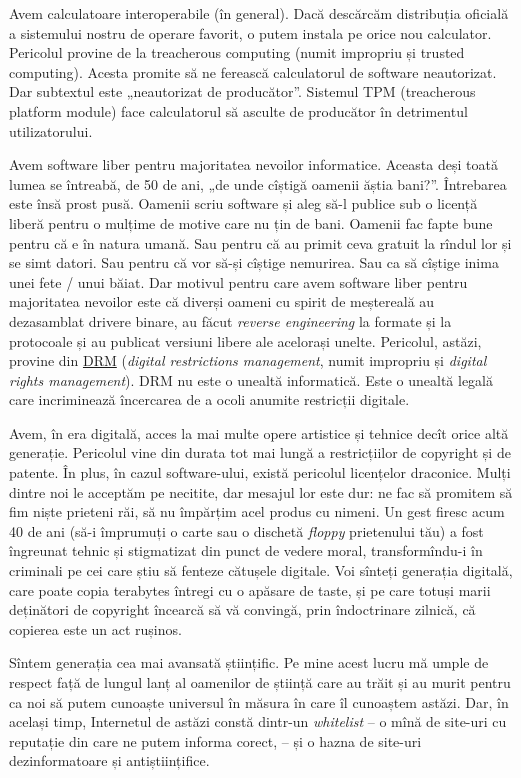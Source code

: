 Avem calculatoare interoperabile (în general). Dacă descărcăm distribuția oficială a sistemului nostru de operare favorit, o putem instala pe orice nou calculator. Pericolul provine de la treacherous computing (numit impropriu și trusted computing). Acesta promite să ne ferească calculatorul de software neautorizat. Dar subtextul este „neautorizat de producător”. Sistemul TPM (treacherous platform module)  face calculatorul să asculte de producător în detrimentul utilizatorului.

Avem software liber pentru majoritatea nevoilor informatice. Aceasta deși toată lumea se întreabă, de 50 de ani, „de unde cîștigă oamenii ăștia bani?”. Întrebarea este însă prost pusă. Oamenii scriu software și aleg să-l publice sub o licență liberă pentru o mulțime de motive care nu țin de bani. Oamenii fac fapte bune pentru că e în natura umană. Sau pentru că au primit ceva gratuit la rîndul lor și se simt datori. Sau pentru că vor să-și cîștige nemurirea. Sau ca să cîștige inima unei fete / unui băiat. Dar motivul pentru care avem software liber pentru majoritatea nevoilor este că diverși oameni cu spirit de meștereală au dezasamblat drivere binare, au făcut \textit{reverse engineering} la formate și la protocoale și au publicat versiuni libere ale acelorași unelte. Pericolul, astăzi, provine din \href{https://pluralistic.net/tag/drm/}{DRM} (\textit{digital restrictions management}, numit impropriu și \textit{digital rights management}). DRM nu este o unealtă informatică. Este o unealtă legală care incriminează încercarea de a ocoli anumite restricții digitale.

Avem, în era digitală, acces la mai multe opere artistice și tehnice decît orice altă generație. Pericolul vine din durata tot mai lungă a restricțiilor de copyright și de patente. În plus, în cazul software-ului, există pericolul licențelor draconice. Mulți dintre noi le acceptăm pe necitite, dar mesajul lor este dur: ne fac să promitem să fim niște prieteni răi, să nu împărțim acel produs cu nimeni. Un gest firesc acum 40 de ani (să-i împrumuți o carte sau o dischetă \textit{floppy} prietenului tău) a fost îngreunat tehnic și stigmatizat din punct de vedere moral, transformîndu-i în criminali pe cei care știu să fenteze cătușele digitale. Voi sînteți generația digitală, care poate copia terabytes întregi cu o apăsare de taste, și pe care totuși marii deținători de copyright încearcă să vă convingă, prin îndoctrinare zilnică, că copierea este un act rușinos.

Sîntem generația cea mai avansată științific. Pe mine acest lucru mă umple de respect față de lungul lanț al oamenilor de știință care au trăit și au murit pentru ca noi să putem cunoaște universul în măsura în care îl cunoaștem astăzi. Dar, în același timp, Internetul de astăzi constă dintr-un \textit{whitelist} -- o mînă de site-uri cu reputație din care ne putem informa corect, -- și o hazna de site-uri dezinformatoare și antiștiințifice.

